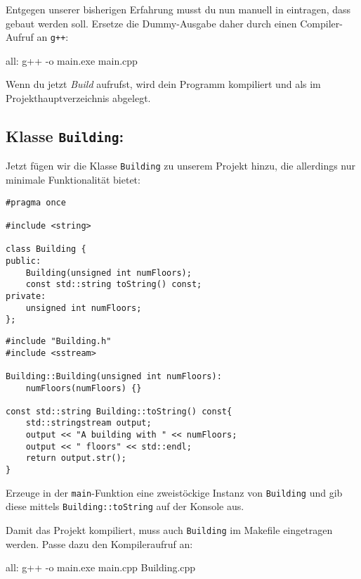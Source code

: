 Entgegen unserer bisherigen Erfahrung musst du nun manuell in  eintragen, dass  gebaut werden soll.
Ersetze die Dummy-Ausgabe daher durch einen Compiler-Aufruf an \texttt{g++}:
\begin{lstmake}
all:
    g++ -o main.exe main.cpp
\end{lstmake}

Wenn du jetzt \emph{Build} aufrufst, wird dein Programm kompiliert und als  im Projekthauptverzeichnis abgelegt.

\subsection{Klasse \lstinline{Building}:}
Jetzt fügen wir die Klasse \lstinline{Building} zu unserem Projekt hinzu, die allerdings nur minimale Funktionalität bietet:

\begin{minipage}[t]{.45\textwidth}
\begin{lstlisting}
#pragma once

#include <string>

class Building {
public:
    Building(unsigned int numFloors);
    const std::string toString() const;
private:
    unsigned int numFloors;
};
\end{lstlisting}
\end{minipage}

\begin{minipage}[t]{.5\textwidth}
\begin{lstlisting}
#include "Building.h"
#include <sstream>

Building::Building(unsigned int numFloors):
    numFloors(numFloors) {}

const std::string Building::toString() const{
    std::stringstream output;
    output << "A building with " << numFloors;
    output << " floors" << std::endl;
    return output.str();
}
\end{lstlisting}
\end{minipage}

Erzeuge in der \lstinline{main}-Funktion eine zweistöckige Instanz von \lstinline{Building} und gib diese mittels \lstinline{Building::toString} auf der Konsole aus.

Damit das Projekt kompiliert, muss auch \lstinline{Building} im Makefile eingetragen werden.
Passe dazu den Kompileraufruf an:
\begin{lstmake}
all:
    g++ -o main.exe main.cpp Building.cpp
\end{lstmake}

